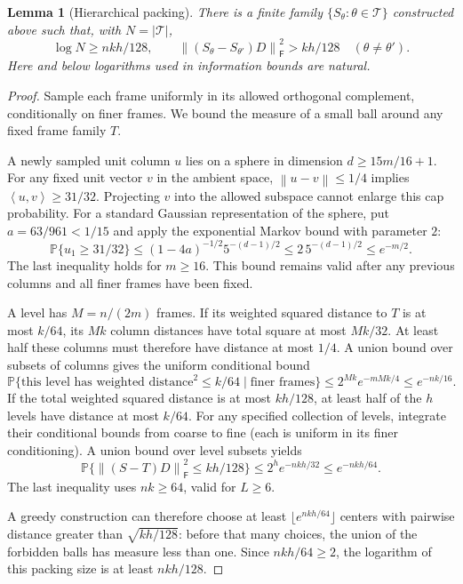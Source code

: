 \documentclass[11pt]{article}
\newtheorem{lemma}[theorem]{Lemma}
\theoremstyle{remark}
\newcommand{\Prob}{\mathbb P}
\newcommand{\F}{\mathsf F}
\newcommand{\norm}[1]{\left\lVert #1\right\rVert}
\newcommand{\ip}[2]{\left\langle #1,#2\right\rangle}
\begin{document}
\begin{lemma}[Hierarchical packing]\label{lem:depthpacking}
There is a finite family $\{S_\theta:\theta\in\mathcal T\}$ constructed above
such that, with $N=|\mathcal T|$,
\begin{equation}\label{eq:depthpack}
 \log N\ge nkh/128,\qquad
 \norm{(S_\theta-S_{\theta'})D}_\F^2>kh/128
 \quad(\theta\ne\theta').
\end{equation}
Here and below logarithms used in information bounds are natural.
\end{lemma}
\begin{proof}
Sample each frame uniformly in its allowed orthogonal complement,
conditionally on finer frames. We bound the measure of a small ball around
any fixed frame family $T$.

A newly sampled unit column $u$ lies on a sphere in dimension
$d\ge15m/16+1$. For any fixed unit vector $v$ in the ambient space,
$\norm{u-v}\le1/4$ implies $\ip uv\ge31/32$.
Projecting $v$ into the allowed subspace cannot enlarge this cap probability.
For a standard Gaussian representation of the sphere, put
$a=63/961<1/15$ and apply the exponential Markov bound with parameter $2$:
\[
 \Prob\{u_1\ge31/32\}
 \le (1-4a)^{-1/2}5^{-(d-1)/2}
 \le 2\,5^{-(d-1)/2}\le e^{-m/2}.
\]
The last inequality holds for $m\ge16$. This bound remains valid after any
previous columns and all finer frames have been fixed.

A level has $M=n/(2m)$ frames. If its weighted squared distance to $T$ is
at most $k/64$, its $Mk$ column distances have total square at most $Mk/32$.
At least half these columns must therefore have distance at most $1/4$.
A union bound over subsets of columns gives the uniform conditional bound
\[
 \Prob\{\text{this level has weighted distance}^2\le k/64
          \mid\text{finer frames}\}
 \le2^{Mk}e^{-mMk/4}\le e^{-nk/16}.
\]
If the total weighted squared distance is at most $kh/128$, at least half
of the $h$ levels have distance at most $k/64$.
For any specified collection of levels, integrate their conditional bounds
from coarse to fine (each is uniform in its finer conditioning).
A union bound over level subsets yields
\begin{equation}\label{eq:smallball}
 \Prob\{\norm{(S-T)D}_\F^2\le kh/128\}
 \le 2^h e^{-nkh/32}\le e^{-nkh/64}.
\end{equation}
The last inequality uses $nk\ge64$, valid for $L\ge6$.

A greedy construction can therefore choose at least
$\lfloor e^{nkh/64}\rfloor$ centers with pairwise distance greater than
$\sqrt{kh/128}$: before that many choices, the union of the forbidden balls
has measure less than one. Since $nkh/64\ge2$, the logarithm of this packing
size is at least $nkh/128$.
\end{proof}
\end{document}
